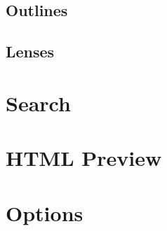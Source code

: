 \documentclass{article}
\begin{document}
\subsection{Outlines}\label{gelement:outlines}

\subsection{Lenses}\label{gelement:lenses}

\newpage

\section{Search}\label{sec:search}

\newpage

\section{HTML Preview}\label{sec:html_preview}

\newpage

\section{Options}\label{sec:options}
\end{document}
